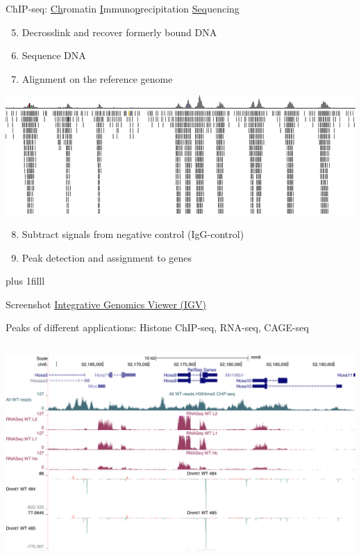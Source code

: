 \documentclass[10pt]{beamer}
\newcommand{\credit}[1]{{\vskip0pt plus 1filll \par \raggedleft \scriptsize \mdseries \color{mDarkBrown} #1 \par}}
\begin{document}
\begin{frame}{ChIP-seq: \underline{Ch}romatin \underline{I}mmuno\underline{p}recipitation \underline{Seq}uencing}
	\begin{enumerate}
		\setcounter{enumi}{4}
		\item Decrosslink and recover formerly bound DNA
		\item Sequence DNA
		\item Alignment on the reference genome
	\end{enumerate}
	\begin{center}
		\includegraphics[width=\textwidth]{./figures/igvpeaks.png}
	\end{center}
	\begin{enumerate}
		\setcounter{enumi}{7}
		\item Subtract signals from negative control (IgG-control)
		\item Peak detection and assignment to genes
	\end{enumerate}
	\credit{Screenshot \href{https://igv.org/doc/desktop/}{Integrative Genomics Viewer (IGV)}}
\end{frame}

\begin{frame}{Peaks of different applications: Histone ChIP-seq, RNA-seq,  CAGE-seq}
	\begin{columns}[T]
		\column{\dimexpr\paperwidth-10pt}
		\includegraphics[width=\textwidth]{./figures/peaks.png}
	\end{columns}
\end{frame}
\end{document}
